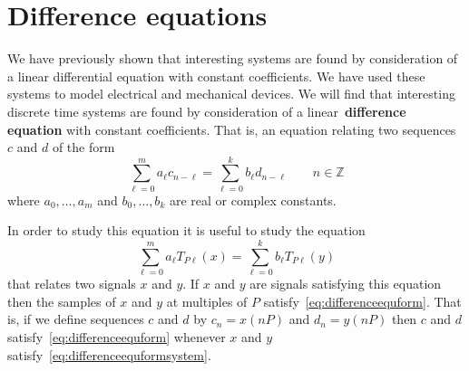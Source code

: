 \documentclass[11pt,a4paper]{book}
\theoremstyle{plain}
\numberwithin{equation}{section}
\newcommand{\ints}{{\mathbb Z}}
\newcommand{\term}{\textbf}
\begin{document}
\section{Difference equations}\label{sec:difference-equations}

We have previously shown that interesting systems are found by consideration of a linear differential equation with constant coefficients.  We have used these systems to model electrical and mechanical devices.  We will find that interesting discrete time systems are found by consideration of a linear~\term{difference equation} with constant coefficients.  That is, an equation relating two sequences $c$ and $d$ of the form
\begin{equation}\label{eq:differenceequform}
\sum_{\ell=0}^{m} a_\ell c_{n - \ell} = \sum_{\ell=0}^{k} b_\ell d_{n - \ell} \qquad n \in \ints
\end{equation}
where $a_0,\dots,a_m$ and $b_0,\dots,b_k$ are real or complex constants.

In order to study this equation it is useful to study the equation
\begin{equation}\label{eq:differenceequformsystem}
\sum_{\ell=0}^{m} a_\ell T_{P\ell}(x) = \sum_{\ell=0}^{k} b_\ell T_{P\ell}(y)
\end{equation}
that relates two signals $x$ and $y$.  If $x$ and $y$ are signals satisfying this equation then the samples of $x$ and $y$ at multiples of $P$ satisfy~\eqref{eq:differenceequform}.  That is, if we define sequences $c$ and $d$ by $c_n = x(nP)$ and $d_n = y(nP)$ then $c$ and $d$ satisfy~\eqref{eq:differenceequform} whenever $x$ and $y$ satisfy~\eqref{eq:differenceequformsystem}.
\end{document}
